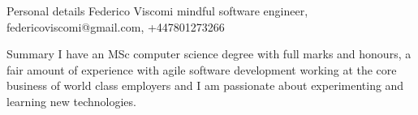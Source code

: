 \documentclass{resume}
\begin{document}
  \begin{rSection}{Personal details}
    Federico Viscomi mindful software engineer, federicoviscomi@gmail.com, +447801273266





  \end{rSection}

  
  \begin{rSection}{Summary}
   I have an MSc computer science degree with full marks and honours, 
    a fair amount of experience with agile software development working at the core business of world class employers
    and I am passionate about experimenting and learning new technologies.


  \end{rSection}
\end{document}
